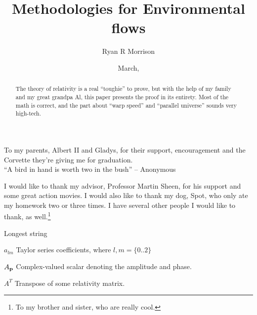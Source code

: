 

\frontmatter

\title{Methodologies for Environmental flows}
\author{Ryan R Morrison}
\date{March, \thisyear} %
\maketitle
\makecopyright

\begin{dedication}
   To my parents, Albert II and Gladys, for their support,
   encouragement and the Corvette they're giving me for graduation. \\[3ex]
   ``A bird in hand is worth two in the bush''
         -- Anonymous
\end{dedication}

\begin{acknowledgments}
   \vspace{1.1in}
   I would like to thank my advisor, Professor Martin Sheen, for his support
   and some great action movies.  I would also like to thank my dog, Spot,
   who only ate my homework two or three times.  I have several other people
   I would like to thank, as well.\footnote{To my brother and sister, who
   are really cool.}
\end{acknowledgments}

\maketitleabstract %

\begin{abstract}
   The theory of relativity is a real ``toughie'' to prove, but with the
   help of my family and my great grandpa Al, this paper presents the
   proof in its entirety.  Most of the math is correct, and the
   part about ``warp speed'' and ``parallel universe'' sounds very high-tech.
\clearpage %
\end{abstract}

\tableofcontents
\listoffigures
\listoftables

\begin{glossary}{Longest  string}
   \item[$a_{lm}$]
      Taylor series coefficients, where $l,m = \{0..2\}$
   \item[$A_{\bf{p}}$]
      Complex-valued scalar denoting the amplitude and phase.
   \item[$A^T$]
      Transpose of some relativity matrix.
\end{glossary}

